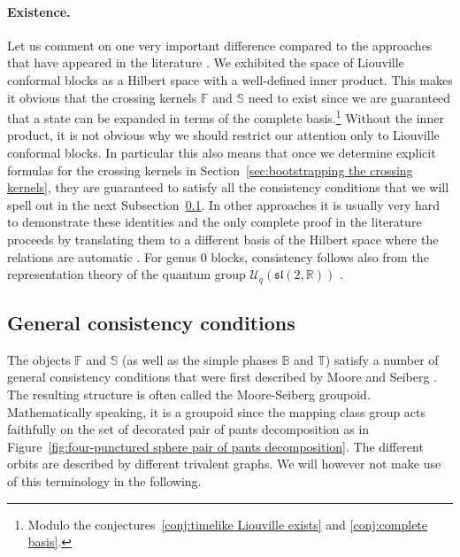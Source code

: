 \documentclass[12pt,a4paper]{article}
\begin{document}
\paragraph{Existence.}
Let us comment on one very important difference compared to the approaches that have appeared in the literature \cite{Ponsot:1999uf, Ponsot:2000mt}. We exhibited the space of Liouville conformal blocks as a Hilbert space with a well-defined inner product.
This makes it obvious that the crossing kernels $\mathbb{F}$ and $\mathbb{S}$ need to exist since we are guaranteed that a state can be expanded in terms of the complete basis.\footnote{Modulo the conjectures~\ref{conj:timelike Liouville exists} and \ref{conj:complete basis}.} Without the inner product, it is not obvious why we should restrict our attention only to Liouville conformal blocks.
In particular this also means that once we determine explicit formulas for the crossing kernels in Section~\ref{sec:bootstrapping the crossing kernels}, they are guaranteed to satisfy all the consistency conditions that we will spell out in the next Subsection~\ref{subsec:Moore Seiberg consistency conditions}. In other approaches it is usually very hard to demonstrate these identities and the only complete proof in the literature proceeds by translating them to a different basis of the Hilbert space where the relations are automatic \cite{Teschner:2013tqy}. For genus 0 blocks, consistency follows also from the representation theory of the quantum group $\mathcal{U}_q(\mathfrak{sl}(2,\mathbb{R}))$ \cite{Ponsot:2000mt,Nidaiev:2013bda}.



\subsection{General consistency conditions} \label{subsec:Moore Seiberg consistency conditions}
The objects $\mathbb{F}$ and $\mathbb{S}$ (as well as the simple phases $\mathbb{B}$ and $\mathbb{T}$) satisfy a number of general consistency conditions that were first described by Moore and Seiberg \cite{Moore:1988qv}. The resulting structure is often called the Moore-Seiberg groupoid. Mathematically speaking, it is a groupoid since the mapping class group acts faithfully on the set of decorated pair of pants decomposition as in Figure~\ref{fig:four-punctured sphere pair of pants decomposition}. The different orbits are described by different trivalent graphs. We will however not make use of this terminology in the following. 
\end{document}
